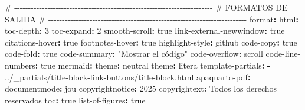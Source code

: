 \documentclass[
  doc,
  floatsintext,
  longtable,
  a4paper,
  nolmodern,
  notxfonts,
  notimes,
  12pt,
  colorlinks=true,linkcolor=blue,citecolor=blue,urlcolor=blue]{apa7}
\newenvironment{Shaded}{\begin{snugshade}}{\end{snugshade}}
\newcommand{\AttributeTok}[1]{\textcolor[rgb]{0.40,0.45,0.13}{#1}}
\newcommand{\CharTok}[1]{\textcolor[rgb]{0.13,0.47,0.30}{#1}}
\newcommand{\CommentTok}[1]{\textcolor[rgb]{0.37,0.37,0.37}{#1}}
\newcommand{\DecValTok}[1]{\textcolor[rgb]{0.68,0.00,0.00}{#1}}
\newcommand{\FunctionTok}[1]{\textcolor[rgb]{0.28,0.35,0.67}{#1}}
\newcommand{\KeywordTok}[1]{\textcolor[rgb]{0.00,0.23,0.31}{\textbf{#1}}}
\newcommand{\StringTok}[1]{\textcolor[rgb]{0.13,0.47,0.30}{#1}}
\begin{document}
\begin{Shaded}
\begin{Highlighting}[]
\CommentTok{\# {-}{-}{-}{-}{-}{-}{-}{-}{-}{-}{-}{-}{-}{-}{-}{-}{-}{-}{-}{-}{-}{-}{-}{-}{-}{-}{-}{-}{-}{-}{-}{-}{-}{-}{-}{-}{-}{-}{-}{-}{-}{-}{-}{-}{-}{-}{-}{-}{-}{-}{-}{-}{-}{-}{-}{-}{-}{-}{-}{-}{-}{-}{-}{-}{-}{-}{-}{-}{-}{-}{-}{-}}
\CommentTok{\# FORMATOS DE SALIDA}
\CommentTok{\# {-}{-}{-}{-}{-}{-}{-}{-}{-}{-}{-}{-}{-}{-}{-}{-}{-}{-}{-}{-}{-}{-}{-}{-}{-}{-}{-}{-}{-}{-}{-}{-}{-}{-}{-}{-}{-}{-}{-}{-}{-}{-}{-}{-}{-}{-}{-}{-}{-}{-}{-}{-}{-}{-}{-}{-}{-}{-}{-}{-}{-}{-}{-}{-}{-}{-}{-}{-}{-}{-}{-}{-}}
\FunctionTok{format}\KeywordTok{:}
\AttributeTok{  }\FunctionTok{html}\KeywordTok{:}
\AttributeTok{    }\FunctionTok{toc{-}depth}\KeywordTok{:}\AttributeTok{ }\DecValTok{3}
\AttributeTok{    }\FunctionTok{toc{-}expand}\KeywordTok{:}\AttributeTok{ }\DecValTok{2}
\AttributeTok{    }\FunctionTok{smooth{-}scroll}\KeywordTok{:}\AttributeTok{ }\CharTok{true}
\AttributeTok{    }\FunctionTok{link{-}external{-}newwindow}\KeywordTok{:}\AttributeTok{ }\CharTok{true}
\AttributeTok{    }\FunctionTok{citations{-}hover}\KeywordTok{:}\AttributeTok{ }\CharTok{true}
\AttributeTok{    }\FunctionTok{footnotes{-}hover}\KeywordTok{:}\AttributeTok{ }\CharTok{true}
\AttributeTok{    }\FunctionTok{highlight{-}style}\KeywordTok{:}\AttributeTok{ github}
\AttributeTok{    }\FunctionTok{code{-}copy}\KeywordTok{:}\AttributeTok{ }\CharTok{true}
\AttributeTok{    }\FunctionTok{code{-}fold}\KeywordTok{:}\AttributeTok{ }\CharTok{true}
\AttributeTok{    }\FunctionTok{code{-}summary}\KeywordTok{:}\AttributeTok{ }\StringTok{"Mostrar el código"}
\AttributeTok{    }\FunctionTok{code{-}overflow}\KeywordTok{:}\AttributeTok{ scroll}
\AttributeTok{    }\FunctionTok{code{-}line{-}numbers}\KeywordTok{:}\AttributeTok{ }\CharTok{true}
\AttributeTok{    }\FunctionTok{mermaid}\KeywordTok{:}
\AttributeTok{      }\FunctionTok{theme}\KeywordTok{:}\AttributeTok{ neutral}
\AttributeTok{    }\FunctionTok{theme}\KeywordTok{:}\AttributeTok{ litera}
\AttributeTok{    }\FunctionTok{template{-}partials}\KeywordTok{:}
\AttributeTok{      }\KeywordTok{{-}}\AttributeTok{ ../\_partials/title{-}block{-}link{-}buttons/title{-}block.html}
\AttributeTok{    }
\AttributeTok{  }\FunctionTok{apaquarto{-}pdf}\KeywordTok{:}
\AttributeTok{    }\FunctionTok{documentmode}\KeywordTok{:}\AttributeTok{ jou}
\AttributeTok{    }\FunctionTok{copyrightnotice}\KeywordTok{:}\AttributeTok{ }\DecValTok{2025}
\AttributeTok{    }\FunctionTok{copyrightext}\KeywordTok{:}\AttributeTok{ Todos los derechos reservados}
\AttributeTok{    }\FunctionTok{toc}\KeywordTok{:}\AttributeTok{ }\CharTok{true}
\AttributeTok{    }\FunctionTok{list{-}of{-}figures}\KeywordTok{:}\AttributeTok{ }\CharTok{true}

\end{Highlighting}
\end{Shaded}
\end{document}
